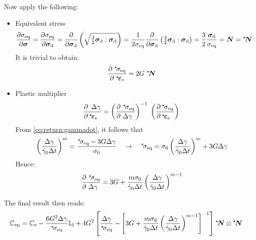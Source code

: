\documentclass[times,namecite]{goose-article}
\newcommand\leftstar[1]{\hspace*{-.3em}~^\star\!#1}
\begin{document}
Now apply the following:
\begin{itemize}
%
\item Equivalent stress
\begin{equation}
\frac{\partial \sigma_\mathrm{eq}}{\partial \bm{\sigma}}
  = \frac{
    \partial \sigma_\mathrm{eq}
  }{
    \partial \bm{\sigma}_\mathrm{d}
  }
  = \frac{
    \partial
  }{
    \partial \bm{\sigma}_\mathrm{d}
  } \left(
    \sqrt{ \tfrac{3}{2} \bm{\sigma}_\mathrm{d} : \bm{\sigma}_\mathrm{d} }
  \right)
  = \frac{1}{2 \sigma_\mathrm{eq} }
  \frac{\partial}{\partial \bm{\sigma}_\mathrm{d}}
  \left(
    \tfrac{3}{2} \bm{\sigma}_\mathrm{d} : \bm{\sigma}_\mathrm{d}
  \right)
  = \frac{3}{2} \frac{\bm{\sigma}_\mathrm{d}}{\sigma_\mathrm{eq}}
  = \bm{N} = \leftstar{\bm{N}}
\end{equation}
It is trivial to obtain:
\begin{equation}
\frac{
    \partial \;\leftstar{\sigma}_\mathrm{eq}
  }{
    \partial \;\leftstar{\bm{\varepsilon}}_\mathrm{e}
  } =
  2 G \;\leftstar{\bm{N}}
\end{equation}
%
\item Plastic multiplier
\begin{align}
  \frac{
    \partial \,~\Delta \gamma \hfill
  }{
    \partial \,\leftstar{\bm{\varepsilon}}_\mathrm{e}  \hfill
  }
  =
  \left( \frac{
    \partial ~\leftstar{\sigma}_\mathrm{eq} \hfill
  }{
    \partial ~\Delta \gamma      \hfill
  } \right)^{-1} \;
  \left( \frac{
    \partial \,\leftstar{\sigma}_\mathrm{eq} \hfill
  }{
    \partial \,\leftstar{\bm{\varepsilon}}_\mathrm{e} \hfill
  } \right) \;
\end{align}
From \eqref{eq:return:gammadot}, it follows that
\begin{equation}
\left(
    \frac{\Delta \gamma}{\dot{\gamma}_0 \Delta t}
  \right)^m
  =
  \frac{
    \leftstar{\sigma}_\mathrm{eq} - 3 G \Delta \gamma
  }{
    \sigma_0
  }
  \quad\rightarrow\quad
  \leftstar{\sigma}_\mathrm{eq}
  =
  \sigma_0 \left( \frac{\Delta \gamma}{\dot{\gamma}_0 \Delta t} \right)^m +
  3 G \Delta \gamma
\end{equation}
Hence:
\begin{equation}
\frac{
    \partial ~\leftstar{\sigma}_\mathrm{eq} \hfill
  }{
    \partial ~\Delta \gamma      \hfill
  }
  =
  3 G + \frac{m \sigma_0}{\dot{\gamma}_0 \Delta t}
  \left(
    \frac{\Delta \gamma}{\dot{\gamma}_0 \Delta t}
  \right)^{m-1}
\end{equation}
%
\end{itemize}
%
The final result then reads:
\begin{equation}
\mathbb{C}_\mathrm{ep}
=
\mathbb{C}_\mathrm{e} -
\frac{6 G^2 \Delta \gamma}{\leftstar{\sigma}_\mathrm{eq}} \mathbb{I}_\mathrm{d}
+ 4 G^2
\left[
  \frac{\Delta \gamma}{\leftstar{\sigma}_\mathrm{eq}} -
  \left[
    3G + \frac{m \sigma_0}{\dot{\gamma}_0 \Delta t}
    \left(
      \frac{\Delta \gamma}{\dot{\gamma}_0 \Delta t}
    \right)^{m-1}
  \right]^{-1}
\right]
\leftstar{\bm{N}} \otimes \leftstar{\bm{N}}
\end{equation}
\end{document}
